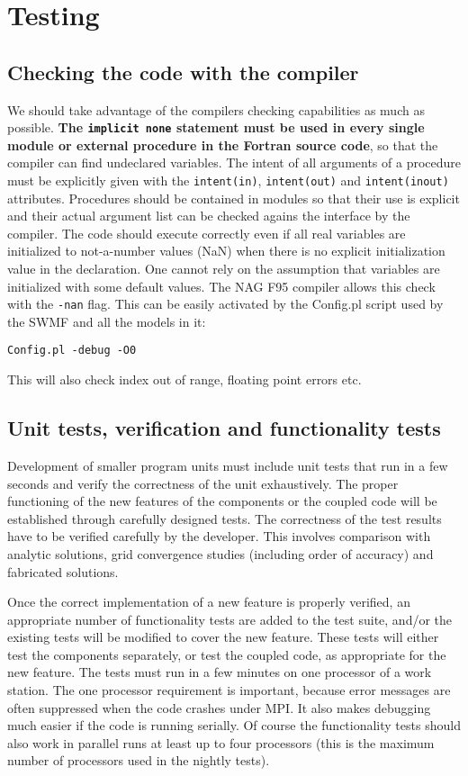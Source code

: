 \documentclass{article}
\begin{document}
\section{Testing}

\subsection{Checking the code with the compiler}

We should take advantage of the compilers checking capabilities 
as much as possible.
{\bf The {\tt implicit none} statement must be used in every single 
module or external procedure in the Fortran source code}, so that the
compiler can find undeclared variables. The intent of all arguments 
of a procedure must be explicitly given with the {\tt intent(in)}, 
{\tt intent(out)} and {\tt intent(inout)} attributes. Procedures should
be contained in modules so that their use is explicit and their actual
argument list can be checked agains the interface by the compiler. 
The code should execute correctly even if all real variables are 
initialized to not-a-number values (NaN)
when there is no explicit initialization value in the declaration.
One cannot rely on the assumption that variables are initialized with
some default values. The NAG F95 compiler allows this check with the 
{\tt -nan} flag. This can be easily activated by the Config.pl script
used by the SWMF and all the models in it:
\begin{verbatim}
Config.pl -debug -O0
\end{verbatim}
This will also check index out of range, floating point errors etc.

\subsection{Unit tests, verification and functionality tests}

Development of smaller program units must include unit tests that 
run in a few seconds and verify the correctness of the unit
exhaustively. 
The proper functioning of the new features of the components or
the coupled code will be established through carefully designed tests.
The correctness of the test results have to be verified 
carefully by the developer. This involves comparison with analytic 
solutions, grid convergence studies (including order of accuracy) 
and fabricated solutions.

Once the correct implementation of a new feature is properly verified,
an appropriate number of functionality tests are added to the test suite,
and/or the existing tests will be modified to cover the new feature.
These tests will either test the components separately, or test the coupled
code, as appropriate for the new feature.
The tests must run in a few minutes on one processor of a work station. 
The one processor requirement is important, because error messages are
often suppressed when the code crashes under MPI. It also makes 
debugging much easier if the code is running serially. Of course the
functionality tests should also work in parallel runs at least up to
four processors (this is the maximum number of processors used in the
nightly tests).
\end{document}
